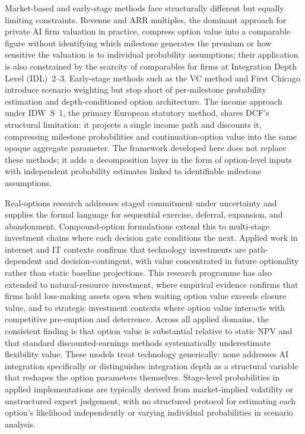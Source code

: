 \documentclass[oneside,10pt]{swissi}
\begin{document}
Market-based and early-stage methods face structurally different but equally limiting constraints. Revenue and ARR multiples, the dominant approach for private AI firm valuation in practice, compress option value into a comparable figure without identifying which milestone generates the premium or how sensitive the valuation is to individual probability assumptions; their application is also constrained by the scarcity of comparables for firms at Integration Depth Level (IDL)~2--3.\cite{damodaran2009young,eisfeldt2023firmvalues} Early-stage methods such as the VC method and First Chicago introduce scenario weighting but stop short of per-milestone probability estimation and depth-conditioned option architecture.\cite{lerner2020vc} The income approach under IDW~S~1, the primary European statutory method, shares DCF's structural limitation: it projects a single income path and discounts it, compressing milestone probabilities and continuation-option value into the same opaque aggregate parameter.\cite{idw2016s1} The framework developed here does not replace these methods; it adds a decomposition layer in the form of option-level inputs with independent probability estimates linked to identifiable milestone assumptions.

Real-options research addresses staged commitment under uncertainty and supplies the formal language for sequential exercise, deferral, expansion, and abandonment.\cite{myers1977borrowing,dixit1994investment,trigeorgis1996realoptions} Compound-option formulations extend this to multi-stage investment chains where each decision gate conditions the next.\cite{geske1979compound,cassimon2004nfold} Applied work in internet and IT contexts confirms that technology investments are path-dependent and decision-contingent, with value concentrated in future optionality rather than static baseline projections.\cite{schwartz2000internet,schwartz2001rational,benaroch1999isre,benaroch2000misq} This research programme has also extended to natural-resource investment, where empirical evidence confirms that firms hold loss-making assets open when waiting option value exceeds closure value,\cite{moeltufano2002mines} and to strategic investment contexts where option value interacts with competitive pre-emption and deterrence.\cite{smittrigeorgis2004strategic} Across all applied domains, the consistent finding is that option value is substantial relative to static NPV and that standard discounted-earnings methods systematically underestimate flexibility value. These models treat technology generically: none addresses AI integration specifically or distinguishes integration depth as a structural variable that reshapes the option parameters themselves. Stage-level probabilities in applied implementations are typically derived from market-implied volatility or unstructured expert judgement, with no structured protocol for estimating each option's likelihood independently or varying individual probabilities in scenario analysis.
\end{document}
